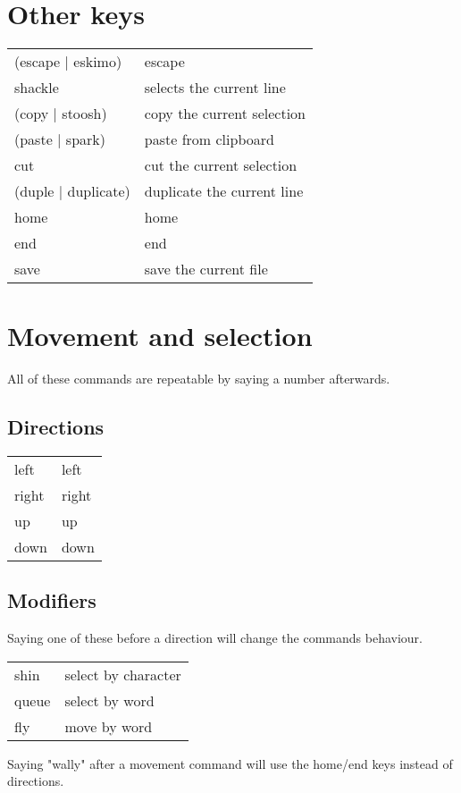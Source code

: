 \documentclass[12pt]{article}
\begin{document}
\section{Other keys}
\begin{longtable}{ l l}
(escape | eskimo) & escape \\
shackle & selects the current line \\
(copy | stoosh) & copy the current selection \\
(paste | spark) & paste from clipboard \\
cut & cut the current selection \\
(duple | duplicate) & duplicate the current line \\
home & home \\
end & end \\
save & save the current file \\
\end{longtable}

\section{Movement and selection}
All of these commands are repeatable by saying a number afterwards.

\subsection{Directions}
\begin{longtable}{ l l}
left & left \\
right & right \\
up & up \\
down & down \\
\end{longtable}

\subsection{Modifiers}
Saying one of these before a direction will change the commands behaviour.

\noindent
\begin{longtable}{ l l}
shin & select by character \\
queue & select by word \\
fly & move by word \\
\end{longtable}

Saying "wally" after a movement command will use the home/end keys instead of directions.
\end{document}
